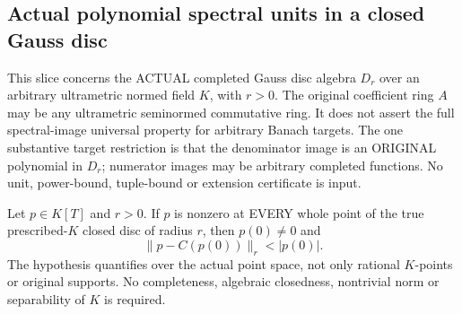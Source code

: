 \subsection{Actual polynomial spectral units in a closed Gauss disc}

This slice concerns the ACTUAL completed Gauss disc algebra $D_r$ over an
arbitrary ultrametric normed field $K$, with $r>0$. The original coefficient
ring $A$ may be any ultrametric seminormed commutative ring. It does not assert
the full spectral-image universal property for arbitrary Banach targets.
The one substantive target restriction is that the denominator image is an
ORIGINAL polynomial in $D_r$; numerator images may be arbitrary completed
functions. No unit, power-bound, tuple-bound or extension certificate is input.

\begin{lemma}
\label{analytic:actual-disc-polynomial-root-dominance}
\leanok
{}
Let $p\in K[T]$ and $r>0$. If $p$ is nonzero at EVERY whole point of the true
prescribed-$K$ closed disc of radius $r$, then $p(0)\ne0$ and
\[
 \|p-C(p(0))\|_r<|p(0)|.
\]
The hypothesis quantifies over the actual point space, not only rational
$K$-points or original supports. No completeness, algebraic closedness,
nontrivial norm or separability of $K$ is required.
\end{lemma}
